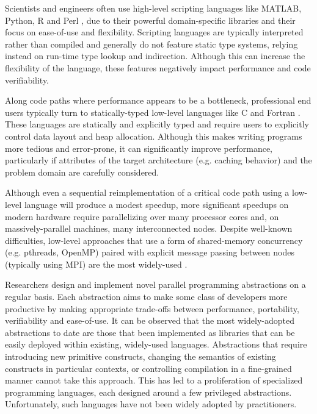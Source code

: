 \documentclass[10pt, conference, compsocconf]{IEEEtran}
\begin{document}
Scientists and engineers often use high-level scripting languages like MATLAB, Python, R and Perl \cite{nguyen2010survey}, due to their powerful domain-specific libraries and their focus on ease-of-use and flexibility. Scripting languages are typically interpreted rather than compiled and generally do not feature static type systems, relying instead on run-time  type lookup and indirection. Although this can increase the flexibility of the language, these features negatively impact  performance and code verifiability.

Along code paths where performance appears to be a bottleneck, professional end users typically turn to statically-typed low-level languages like C and Fortran \cite{4222616}. These languages are statically and explicitly typed and require users to explicitly control data layout and heap allocation. Although this makes writing programs more tedious and error-prone, it can significantly improve performance, particularly if attributes of the target architecture (e.g. caching behavior) and the problem domain are carefully considered. 

Although even a sequential reimplementation of a critical code path using a low-level language will produce a modest speedup, more significant speedups on modern hardware require parallelizing over many processor cores and, on massively-parallel machines, many interconnected nodes. Despite well-known difficulties, low-level approaches that use a form of shared-memory concurrency (e.g. pthreads, OpenMP) paired with explicit message passing between nodes (typically using MPI) are the most widely-used \cite{4222616}\cite{basili2008understanding}. 

Researchers design and implement novel parallel programming abstractions\- on a regular basis. Each abstraction aims to make some class of developers more productive by making appropriate trade-offs between performance, portability, verifiability and ease-of-use. It can be observed that the most widely-adopted abstractions to date are those that been implemented as libraries that can be easily deployed within existing, widely-used languages. Abstractions that require introducing new primitive constructs, changing the semantics of existing constructs in particular contexts, or controlling compilation in a fine-grained manner cannot take this approach. This has led to a proliferation of specialized programming languages, each designed around a few privileged abstractions. Unfortunately, such languages have not been widely adopted by practitioners.
\end{document}
